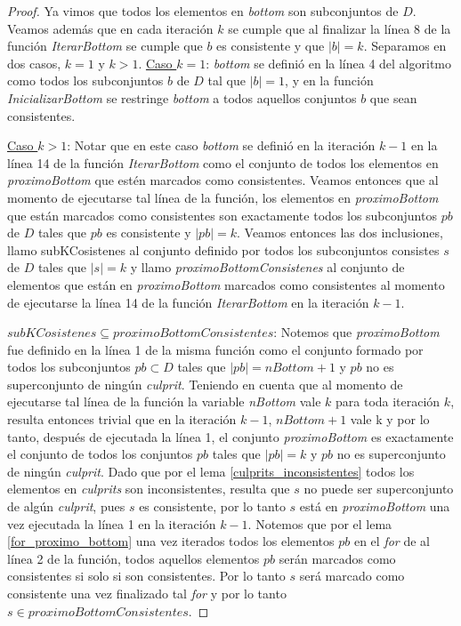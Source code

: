 \documentclass[11pt,a4paper,twoside]{tesis}
\begin{document}
\begin{proof}
Ya vimos que todos los elementos en \textit{bottom} son subconjuntos de $D$. Veamos además que en cada iteración $k$ se cumple que al finalizar la línea 8 de la función \textit{IterarBottom} se cumple que $b$ es consistente y que $|b| = k$. Separamos en dos casos, $k=1$ y $k>1$.
\underline{Caso $k=1$}: \textit{bottom} se definió en la línea 4 del algoritmo como
todos los subconjuntos $b$ de $D$ tal que $|b| = 1$, y en la función \textit{InicializarBottom} se restringe \textit{bottom} a todos aquellos conjuntos $b$ que sean consistentes.

\underline{Caso $k>1$}: Notar que en este caso \textit{bottom} se definió en la iteración $k-1$ en la línea 14 de la función \textit{IterarBottom} como el conjunto de todos los elementos en \textit{proximoBottom} que estén marcados como consistentes. Veamos entonces que al momento de ejecutarse tal línea de la función, los elementos en \textit{proximoBottom} que están marcados como consistentes son exactamente todos los subconjuntos $pb$ de $D$ tales que $pb$ es consistente y $|pb| = k$. Veamos entonces las dos inclusiones, llamo subKCosistenes al conjunto definido por todos los subconjuntos consistes $s$ de $D$ tales que $|s| = k$ y llamo \textit{proximoBottomConsistenes} al conjunto de elementos que están en \textit{proximoBottom} marcados como consistentes al momento de ejecutarse la línea 14 de la función \textit{IterarBottom} en la iteración $k-1$.

\underline{$subKCosistenes \subseteq proximoBottomConsistentes$}: Notemos que \textit{proximoBottom} fue definido en la línea 1 de la misma función como el conjunto formado por todos los subconjuntos $pb \subset D$ tales que $|pb| = nBottom + 1$ y $pb$ no es superconjunto de ningún \textit{culprit}. Teniendo en cuenta que al momento de ejecutarse tal línea de la función la variable \textit{nBottom} vale $k$ para toda iteración $k$, resulta entonces trivial que en la iteración $k-1$, $nBottom + 1$ vale k y por lo tanto, después de ejecutada la línea 1, el conjunto \textit{proximoBottom} es exactamente el conjunto de todos los conjuntos $pb$ tales que $|pb| = k $ y $pb$ no es superconjunto de ningún \textit{culprit}. Dado que por el lema \ref{culprits_inconsistentes} todos los elementos en \textit{culprits} son inconsistentes, resulta que $s$ no puede ser superconjunto de algún \textit{culprit}, pues $s$ es consistente, por lo tanto $s$ está en \textit{proximoBottom} una vez ejecutada la línea 1 en la iteración $k-1$.
Notemos que por el lema \ref{for_proximo_bottom} una vez iterados todos los elementos $pb$ en el \textit{for} de al línea 2 de la función, todos aquellos elementos $pb$ serán marcados como consistentes si solo si son consistentes. Por lo tanto $s$ será marcado como consistente una vez finalizado tal \textit{for} y por lo tanto $s \in proximoBottomConsistentes$. 


\end{proof}
\end{document}
